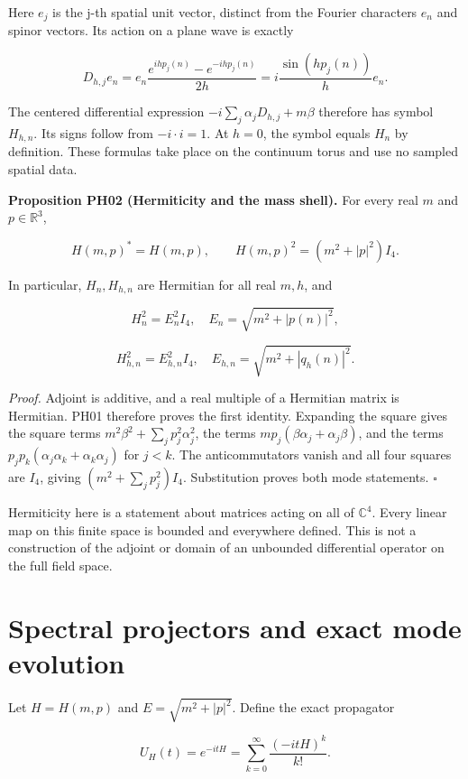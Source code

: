 Here \(e_j\) is the j-th spatial unit vector, distinct from the Fourier
characters \(e_n\) and spinor vectors. Its action on a plane wave is
exactly

\[
D_{h,j}e_n
=e_n\frac{e^{ihp_j(n)}-e^{-ihp_j(n)}}{2h}
=i\frac{\sin(hp_j(n))}{h}e_n.
\]

The centered differential expression \(-i\sum_j\alpha_jD_{h,j}+m\beta\)
therefore has symbol \(H_{h,n}\). Its signs follow from \(-i\cdot i=1\).
At \(h=0\), the symbol equals \(H_n\) by definition. These formulas take
place on the continuum torus and use no sampled spatial data.

\textbf{Proposition PH02 (Hermiticity and the mass shell).} For every
real \(m\) and \(p\in\mathbb R^3\),

\[
H(m,p)^*=H(m,p),\qquad
H(m,p)^2=(m^2+|p|^2)I_4.
\]

In particular, \(H_n,H_{h,n}\) are Hermitian for all real \(m,h\), and

\[
H_n^2=E_n^2I_4,\quad E_n=\sqrt{m^2+|p(n)|^2},
\]

\[
H_{h,n}^2=E_{h,n}^2I_4,\quad
E_{h,n}=\sqrt{m^2+|q_h(n)|^2}.
\]

\emph{Proof.} Adjoint is additive, and a real multiple of a Hermitian
matrix is Hermitian. PH01 therefore proves the first identity. Expanding
the square gives the square terms \(m^2\beta^2+\sum_jp_j^2\alpha_j^2\),
the terms \(mp_j(\beta\alpha_j+\alpha_j\beta)\), and the terms
\(p_jp_k(\alpha_j\alpha_k+\alpha_k\alpha_j)\) for \(j<k\). The
anticommutators vanish and all four squares are \(I_4\), giving
\((m^2+\sum_jp_j^2)I_4\). Substitution proves both mode statements.
\(\square\)

Hermiticity here is a statement about matrices acting on all of
\(\mathbb C^4\). Every linear map on this finite space is bounded and
everywhere defined. This is not a construction of the adjoint or domain
of an unbounded differential operator on the full field space.

\hypertarget{spectral-projectors-and-exact-mode-evolution}{%
\section{Spectral projectors and exact mode
evolution}\label{spectral-projectors-and-exact-mode-evolution}}

Let \(H=H(m,p)\) and \(E=\sqrt{m^2+|p|^2}\). Define the exact propagator

\[
U_H(t)=e^{-itH}=\sum_{k=0}^{\infty}\frac{(-itH)^k}{k!}.
\]

